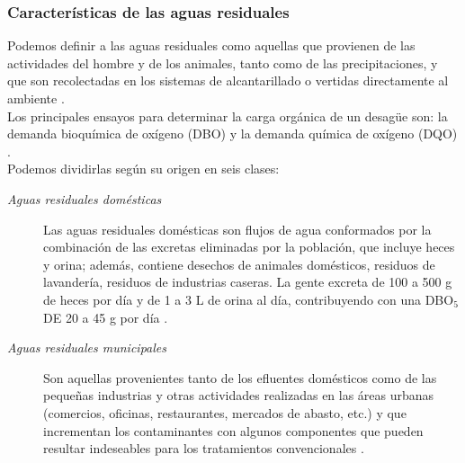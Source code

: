 \subsubsection*{Características de las aguas residuales}
Podemos definir a las aguas residuales como aquellas que provienen de las actividades del hombre y de los animales, tanto como de las precipitaciones, y que son recolectadas en los sistemas de alcantarillado o vertidas directamente al ambiente \emph{\citep{carreno17}}.\\
Los principales ensayos para determinar la carga orgánica de un desagüe son: la demanda bioquímica de oxígeno (DBO) y la demanda química de oxígeno (DQO) \emph{\citep{carreno17}}.\\
Podemos dividirlas según su origen en seis clases:
\begin{small}
\begin{description}
\item[\textit{Aguas residuales domésticas}]
Las aguas residuales domésticas son flujos de agua conformados por la combinación de las excretas eliminadas por la población, que incluye heces y orina; además, contiene desechos de animales domésticos, residuos de lavandería, residuos de industrias caseras. La gente excreta de 100 a 500 g de heces por día y de 1 a 3 L de orina al día, contribuyendo con una DBO$_{5}$ DE 20 a 45 g por día \emph{\citep{carreno17}}. 
\item[\textit{Aguas residuales municipales}]
Son aquellas provenientes tanto de los efluentes domésticos como de las pequeñas industrias y otras actividades realizadas en las áreas urbanas (comercios, oficinas, restaurantes, mercados de abasto, etc.) y que incrementan los contaminantes con algunos componentes que pueden resultar indeseables para los tratamientos convencionales \emph{\citep{carreno17}}.

\end{description}
\end{small}
